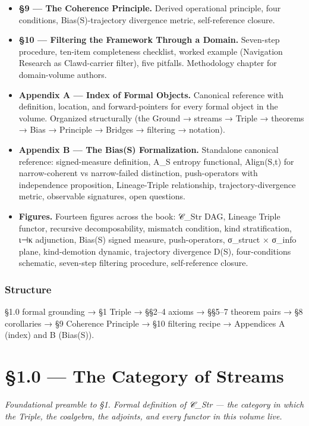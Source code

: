\documentclass[11pt, openany]{book}
\begin{document}
\begin{itemize}
\item \textbf{§9 --- The Coherence Principle.} Derived operational principle, four conditions, Bias(S)-trajectory divergence metric, self-reference closure.
\item \textbf{§10 --- Filtering the Framework Through a Domain.} Seven-step procedure, ten-item completeness checklist, worked example (Navigation Research as Clawd-carrier filter), five pitfalls. Methodology chapter for domain-volume authors.
\item \textbf{Appendix A --- Index of Formal Objects.} Canonical reference with definition, location, and forward-pointers for every formal object in the volume. Organized structurally (the Ground → streams → Triple → theorems → Bias → Principle → Bridges → filtering → notation).
\item \textbf{Appendix B --- The Bias(S) Formalization.} Standalone canonical reference: signed-measure definition, A\_\allowbreak{}S entropy functional, Align(S,t) for narrow-coherent vs narrow-failed distinction, push-operators with independence proposition, Lineage-Triple relationship, trajectory-divergence metric, observable signatures, open questions.
\item \textbf{Figures.} Fourteen figures across the book: 𝒞\_\allowbreak{}Str DAG, Lineage Triple functor, recursive decomposability, mismatch condition, kind stratification, ι⊣κ adjunction, Bias(S) signed measure, push-operators, σ\_\allowbreak{}struct × σ\_\allowbreak{}info plane, kind-demotion dynamic, trajectory divergence D(S), four-conditions schematic, seven-step filtering procedure, self-reference closure.
\end{itemize}

\subsection{Structure}

§1.0 formal grounding → §1 Triple → §§2–4 axioms → §§5–7 theorem pairs → §8 corollaries → §9 Coherence Principle → §10 filtering recipe → Appendices A (index) and B (Bias(S)).


\chapter{§1.0 — The Category of Streams}


\textit{Foundational preamble to §1. Formal definition of 𝒞\_\allowbreak{}Str --- the category in which the Triple, the coalgebra, the adjoints, and every functor in this volume live.}
\end{document}
